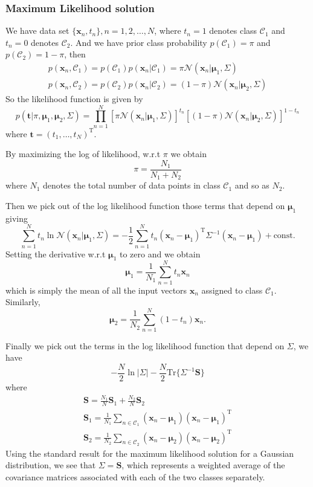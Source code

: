 \documentclass[a4paper]{book}
\newcommand{\normD}{\mathcal{N}}
\newcommand{\mrm}{\mathrm}
\newcommand{\mbf}{\mathbf}
\newcommand{\mcal}{\mathcal}
\newcommand{\ttt}{\mbf t}
\newcommand{\xx}{\mbf x}
\newcommand{\bmu}{\bm{\mu}}
\newcommand{\rev}{^{-1}}
\newcommand{\cat}{\mcal C}
\newcommand{\trans}{^{\mrm T}}
\begin{document}
\subsubsection*{Maximum Likelihood solution}
We have data set $\{\xx_n, t_n\}, n = 1,2,\dots,N$, where $t_n=1$ denotes class $\mcal C_1$ and $t_n =0$ denotes $\mcal C_2$. And  we have prior class probability $p(\cat_1)=\pi$ and $p(\cat_2) = 1-\pi$, then
\begin{gather}\label{}
  p(\xx_n,\cat_1) = p(\cat_1)p(\xx_n|\cat_1) = \pi\normD(\xx_n|\bmu_1,\Sigma)
  \\
  p(\xx_n,\cat_2) = p(\cat_2)p(\xx_n|\cat_2) = (1-\pi)\normD(\xx_n|\bmu_2,\Sigma)
\end{gather}
So the likelihood function is given by
\begin{equation}\label{}
  p(\ttt|\pi, \bmu_1,\bmu_2,\Sigma) = \prod_{n=1}^{N}[\pi\normD(\xx_n|\bmu_1,\Sigma)]^{t_n}[(1-\pi)\normD(\xx_n|\bmu_2,\Sigma)]^{1-t_n}
\end{equation}
where $\ttt = (t_1,\dots,t_N)\trans$.

By maximizing the log of likelihood, w.r.t $\pi$ we obtain
\begin{equation}\label{}
  \pi=\frac{N_1}{N_1+N_2}
\end{equation}
where $N_1$ denotes the total number of data points in class $\cat_1$ and so as $N_2$.

Then we pick out of the log likelihood function those terms that depend on $\bmu_1$ giving
\begin{equation}\label{}
  \sum_{n=1}^{N}t_n\ln \normD(\xx_n|\bmu_1,\Sigma) = -\frac{1}{2}\sum_{n=1}^{N}t_n(\xx_n-\bmu_1)\trans\Sigma\rev(\xx_n-\bmu_1) + \mrm{const}.
\end{equation}
Setting the derivative w.r.t $\bmu_1$ to zero and we obtain
\begin{equation}\label{}
  \bmu_1=\frac1{N_1}\sum_{n=1}^{N}t_n\xx_n
\end{equation}
which is simply the mean of all the input vectors $\xx_n$ assigned to class $\cat_1$. Similarly,
\begin{equation}\label{}
  \bmu_2 = \frac{1}{N_2}\sum_{n=1}^N(1-t_n)\xx_n.
\end{equation}

Finally we pick out the terms in the log likelihood function that depend on $\Sigma$, we have
\begin{equation}\label{}
  -\frac{N}{2}\ln|\Sigma|-\frac N2\mrm{Tr}\{\Sigma\rev\mbf S\}
\end{equation}
where
\begin{gather}\label{}
  \mbf S = \frac{N_1}{N}\mbf S_1+\frac{N_2}{N}\mbf S_2 \\
  \mbf S_1 = \frac{1}{N_1}\sum_{n\in \cat_1}(\xx_n-\bmu_1)(\xx_n-\bmu_1)\trans \\
  \mbf S_2 = \frac{1}{N_2}\sum_{n\in \cat_2}(\xx_n-\bmu_2)(\xx_n-\bmu_2)\trans
\end{gather}
Using the standard result for the maximum likelihood solution for a Gaussian distribution, we see that $\Sigma = \mbf S$, which represents a weighted average of the covariance matrices associated with each of the two classes separately.
\end{document}

